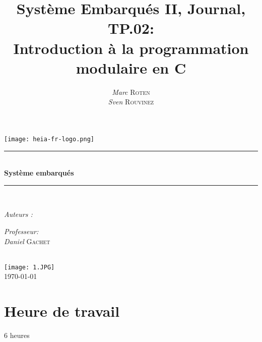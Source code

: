 

\title{Système Embarqués II, Journal, TP.02:\\ Introduction à la programmation modulaire en C} 
\author{\textsl{Marc} \textsc{Roten} \\ \textsl{Sven} \textsc{Rouvinez}}
\date{}


    \begin{titlepage}
        \begin{center}
            \texttt{[image: heia-fr-logo.png]}\\[1.3cm]
            
            \rule{\linewidth}{0.3mm} \\[0.3cm]
            {\huge \bfseries Système embarqués \\[0.5cm]} 
            \rule{\linewidth}{0.3mm} \\[0.8cm]
            \noindent
            \begin{minipage}[t]{0.4\textwidth}
                \begin{flushleft} \large
                    \emph{Auteurs :}\\
                    \theauthor
                \end{flushleft}
            \end{minipage}
            \begin{minipage}[t]{0.4\textwidth} 
                \begin{flushright} \large
                    \emph{Professeur:}\\
                    \textsl{Daniel} \textsc{Gachet}\\ 
                \end{flushright} 
                \vfill
            \end{minipage}\\[1.3cm]
            \texttt{[image: 1.JPG]}\\[1.5cm]
            \vspace*{1\baselineskip}
            \today \\[0.7cm]
        \end{center}
    \end{titlepage}
    \tableofcontents
    \clearpage
\section{Heure de travail}
6 heures

